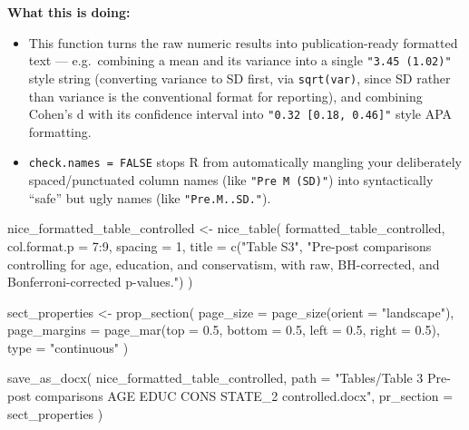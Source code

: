 \documentclass[
  letterpaper,
  DIV=11,
  numbers=noendperiod]{scrreprt}
\newenvironment{Shaded}{\begin{snugshade}}{\end{snugshade}}
\newcommand{\AttributeTok}[1]{\textcolor[rgb]{0.40,0.45,0.13}{#1}}
\newcommand{\DecValTok}[1]{\textcolor[rgb]{0.68,0.00,0.00}{#1}}
\newcommand{\FloatTok}[1]{\textcolor[rgb]{0.68,0.00,0.00}{#1}}
\newcommand{\FunctionTok}[1]{\textcolor[rgb]{0.28,0.35,0.67}{#1}}
\newcommand{\NormalTok}[1]{\textcolor[rgb]{0.00,0.23,0.31}{#1}}
\newcommand{\OtherTok}[1]{\textcolor[rgb]{0.00,0.23,0.31}{#1}}
\newcommand{\SpecialCharTok}[1]{\textcolor[rgb]{0.37,0.37,0.37}{#1}}
\newcommand{\StringTok}[1]{\textcolor[rgb]{0.13,0.47,0.30}{#1}}
\begin{document}
\textbf{What this is doing:}

\begin{itemize}
\item
  This function turns the raw numeric results into publication-ready
  formatted text --- e.g.~combining a mean and its variance into a
  single \texttt{"3.45\ (1.02)"} style string (converting variance to SD
  first, via \texttt{sqrt(var)}, since SD rather than variance is the
  conventional format for reporting), and combining Cohen's d with its
  confidence interval into \texttt{"0.32\ {[}0.18,\ 0.46{]}"} style APA
  formatting.
\item
  \texttt{check.names\ =\ FALSE} stops R from automatically mangling
  your deliberately spaced/punctuated column names (like
  \texttt{"Pre\ M\ (SD)"}) into syntactically ``safe'' but ugly names
  (like \texttt{"Pre.M..SD."}).
\end{itemize}

\begin{Shaded}
\begin{Highlighting}[]
\NormalTok{nice\_formatted\_table\_controlled }\OtherTok{\textless{}{-}} \FunctionTok{nice\_table}\NormalTok{(}
\NormalTok{  formatted\_table\_controlled,}
  \AttributeTok{col.format.p =} \DecValTok{7}\SpecialCharTok{:}\DecValTok{9}\NormalTok{,}
  \AttributeTok{spacing      =} \DecValTok{1}\NormalTok{,}
  \AttributeTok{title        =} \FunctionTok{c}\NormalTok{(}\StringTok{"Table S3"}\NormalTok{, }\StringTok{"Pre{-}post comparisons controlling for age, education, and conservatism, with raw, BH{-}corrected, and Bonferroni{-}corrected p{-}values."}\NormalTok{)}
\NormalTok{)}

\NormalTok{sect\_properties }\OtherTok{\textless{}{-}} \FunctionTok{prop\_section}\NormalTok{(}
  \AttributeTok{page\_size    =} \FunctionTok{page\_size}\NormalTok{(}\AttributeTok{orient =} \StringTok{"landscape"}\NormalTok{),}
  \AttributeTok{page\_margins =} \FunctionTok{page\_mar}\NormalTok{(}\AttributeTok{top =} \FloatTok{0.5}\NormalTok{, }\AttributeTok{bottom =} \FloatTok{0.5}\NormalTok{, }\AttributeTok{left =} \FloatTok{0.5}\NormalTok{, }\AttributeTok{right =} \FloatTok{0.5}\NormalTok{),}
  \AttributeTok{type         =} \StringTok{"continuous"}
\NormalTok{)}

\FunctionTok{save\_as\_docx}\NormalTok{(}
\NormalTok{  nice\_formatted\_table\_controlled,}
  \AttributeTok{path       =} \StringTok{"Tables/Table 3 Pre{-}post comparisons AGE EDUC CONS STATE\_2 controlled.docx"}\NormalTok{,}
  \AttributeTok{pr\_section =}\NormalTok{ sect\_properties}
\NormalTok{)}
\end{Highlighting}
\end{Shaded}
\end{document}
